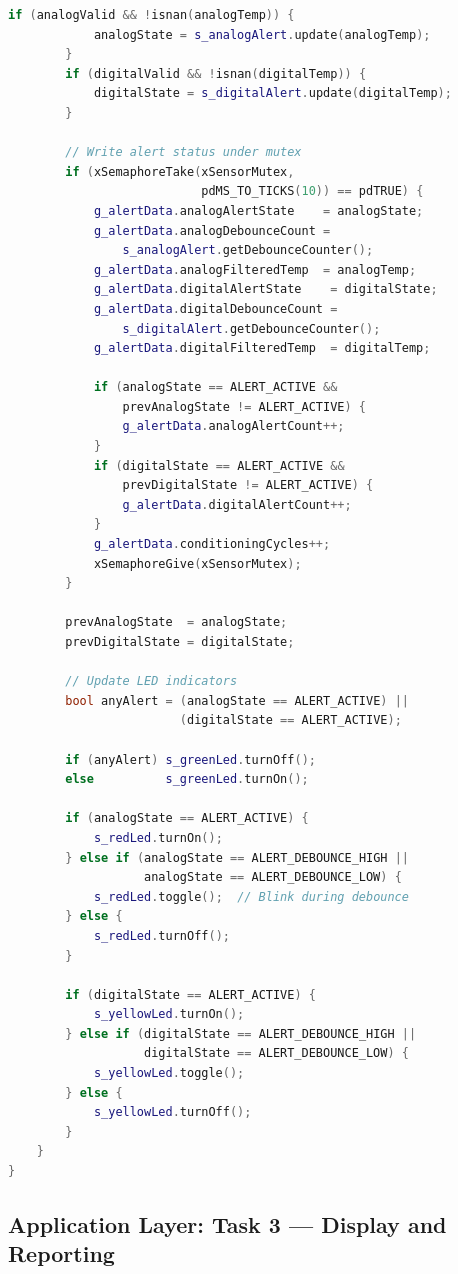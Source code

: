 \begin{lstlisting}[language=C++, caption=task\_conditioning.cpp --- Signal Conditioning Task Implementation]
        if (analogValid && !isnan(analogTemp)) {
            analogState = s_analogAlert.update(analogTemp);
        }
        if (digitalValid && !isnan(digitalTemp)) {
            digitalState = s_digitalAlert.update(digitalTemp);
        }

        // Write alert status under mutex
        if (xSemaphoreTake(xSensorMutex,
                           pdMS_TO_TICKS(10)) == pdTRUE) {
            g_alertData.analogAlertState    = analogState;
            g_alertData.analogDebounceCount =
                s_analogAlert.getDebounceCounter();
            g_alertData.analogFilteredTemp  = analogTemp;
            g_alertData.digitalAlertState    = digitalState;
            g_alertData.digitalDebounceCount =
                s_digitalAlert.getDebounceCounter();
            g_alertData.digitalFilteredTemp  = digitalTemp;

            if (analogState == ALERT_ACTIVE &&
                prevAnalogState != ALERT_ACTIVE) {
                g_alertData.analogAlertCount++;
            }
            if (digitalState == ALERT_ACTIVE &&
                prevDigitalState != ALERT_ACTIVE) {
                g_alertData.digitalAlertCount++;
            }
            g_alertData.conditioningCycles++;
            xSemaphoreGive(xSensorMutex);
        }

        prevAnalogState  = analogState;
        prevDigitalState = digitalState;

        // Update LED indicators
        bool anyAlert = (analogState == ALERT_ACTIVE) ||
                        (digitalState == ALERT_ACTIVE);

        if (anyAlert) s_greenLed.turnOff();
        else          s_greenLed.turnOn();

        if (analogState == ALERT_ACTIVE) {
            s_redLed.turnOn();
        } else if (analogState == ALERT_DEBOUNCE_HIGH ||
                   analogState == ALERT_DEBOUNCE_LOW) {
            s_redLed.toggle();  // Blink during debounce
        } else {
            s_redLed.turnOff();
        }

        if (digitalState == ALERT_ACTIVE) {
            s_yellowLed.turnOn();
        } else if (digitalState == ALERT_DEBOUNCE_HIGH ||
                   digitalState == ALERT_DEBOUNCE_LOW) {
            s_yellowLed.toggle();
        } else {
            s_yellowLed.turnOff();
        }
    }
}
\end{lstlisting}

\subsection{Application Layer: Task 3 --- Display and Reporting}


